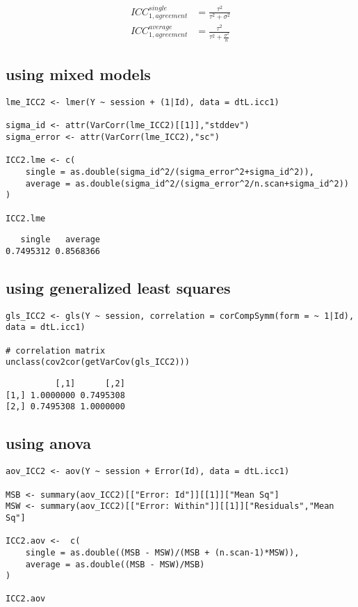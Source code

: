 \documentclass[12pt]{article}
\begin{document}
\begin{align}
 ICC^{single}_{1,agreement} &= \frac{\tau^2}{\tau^2 + \sigma^2} \\
 ICC^{average}_{1,agreement} &= \frac{\tau^2}{\tau^2 + \frac{\sigma^2}{n}}
\end{align}

\clearpage

\subsection{using mixed models}
\label{sec:org20de13e}
\lstset{language=r,label= ,caption= ,captionpos=b,numbers=none}
\begin{lstlisting}
lme_ICC2 <- lmer(Y ~ session + (1|Id), data = dtL.icc1)

sigma_id <- attr(VarCorr(lme_ICC2)[[1]],"stddev")
sigma_error <- attr(VarCorr(lme_ICC2),"sc")

ICC2.lme <- c(
    single = as.double(sigma_id^2/(sigma_error^2+sigma_id^2)),
    average = as.double(sigma_id^2/(sigma_error^2/n.scan+sigma_id^2))
)

ICC2.lme
\end{lstlisting}

\begin{verbatim}
   single   average 
0.7495312 0.8568366
\end{verbatim}


\subsection{using generalized least squares}
\label{sec:org18b2737}
\lstset{language=r,label= ,caption= ,captionpos=b,numbers=none}
\begin{lstlisting}
gls_ICC2 <- gls(Y ~ session, correlation = corCompSymm(form = ~ 1|Id), data = dtL.icc1)

# correlation matrix
unclass(cov2cor(getVarCov(gls_ICC2)))
\end{lstlisting}

\begin{verbatim}
          [,1]      [,2]
[1,] 1.0000000 0.7495308
[2,] 0.7495308 1.0000000
\end{verbatim}


\subsection{using anova}
\label{sec:org7fc92bc}
\lstset{language=r,label= ,caption= ,captionpos=b,numbers=none}
\begin{lstlisting}
aov_ICC2 <- aov(Y ~ session + Error(Id), data = dtL.icc1) 

MSB <- summary(aov_ICC2)[["Error: Id"]][[1]]["Mean Sq"]
MSW <- summary(aov_ICC2)[["Error: Within"]][[1]]["Residuals","Mean Sq"]

ICC2.aov <-  c(
    single = as.double((MSB - MSW)/(MSB + (n.scan-1)*MSW)),
    average = as.double((MSB - MSW)/MSB)
)

ICC2.aov
\end{lstlisting}
\end{document}
